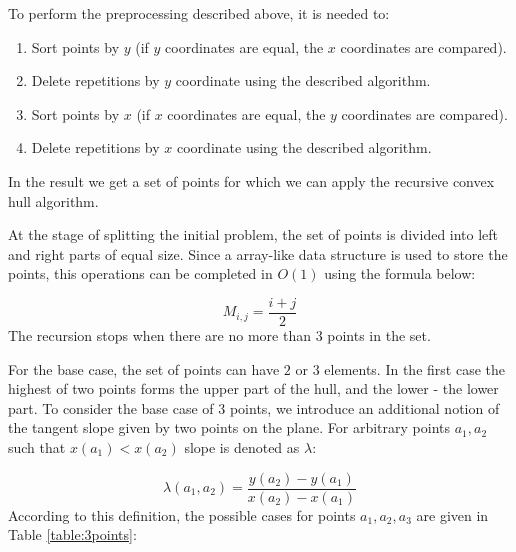 \documentclass[conference]{IEEEtran}
\theoremstyle{plane}
\begin{document}
		To perform the preprocessing described above, it is needed to:
		
		\begin{enumerate}
			\item
			Sort points by $y$ (if $y$ coordinates are equal, the $x$ coordinates are compared).
			\item
			Delete repetitions by $y$ coordinate using the described algorithm.
			\item
			Sort points by $x$ (if $x$ coordinates are equal, the $y$ coordinates are compared).
			\item
			Delete repetitions by $x$ coordinate using the described algorithm.
		\end{enumerate}
	
		In the result we get a set of points for which we can apply the recursive convex hull algorithm.
		

		
		At the stage of splitting the initial problem, the set of points is divided into left and right parts of equal size. Since a array-like data structure is used to store the points, this operations can be completed in $O(1)$ using the formula below:
		
		\begin{equation}
			M_{i,j}=\frac{i+j}{2}
		\end{equation}
		The recursion stops when there are no more than $3$ points in the set.
		
		For the base case, the set of points can have $2$ or $3$ elements. In the first case the highest of two points forms the upper part of the hull, and the lower - the lower part. To consider the base case of $3$ points, we introduce an additional notion of the tangent slope given by two points on the plane. For arbitrary points $a_1, a_2$ such that $x(a_1)<x(a_2)$ slope is denoted as $\lambda$:
		
		\begin{equation}
			\lambda(a_1, a_2)=\frac{y(a_2)-y(a_1)}{x(a_2)-x(a_1)}
		\end{equation}
		According to this definition, the possible cases for points $a_1,a_2,a_3$ are given in Table \ref{table:3points}:
		
\end{document}
